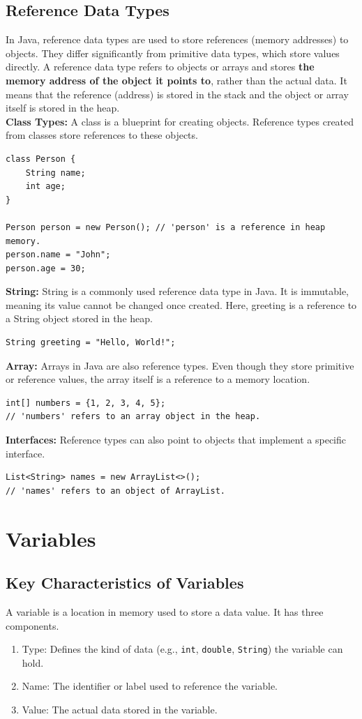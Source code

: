 \documentclass[letterpaper,12pt]{article}
\begin{document}
\subsection{Reference Data Types}
In Java, reference data types are used to store references (memory addresses) to objects. They differ significantly from primitive data types, which store values directly. A reference data type refers to objects or arrays and stores \textbf{the memory address of the object it points to}, rather than the actual data. It means that the reference (address) is stored in the stack and the object or array itself is stored in the heap.\\
\textbf{Class Types: }A class is a blueprint for creating objects. Reference types created from classes store references to these objects.
\begin{verbatim}
class Person {
    String name;
    int age;
}

Person person = new Person(); // 'person' is a reference in heap memory.
person.name = "John";
person.age = 30;
\end{verbatim}
\textbf{String:} String is a commonly used reference data type in Java. It is immutable, meaning its value cannot be changed once created. Here, greeting is a reference to a String object stored in the heap.
\begin{verbatim}
String greeting = "Hello, World!";
\end{verbatim}
\textbf{Array: }Arrays in Java are also reference types. Even though they store primitive or reference values, the array itself is a reference to a memory location.
\begin{verbatim}
int[] numbers = {1, 2, 3, 4, 5};
// 'numbers' refers to an array object in the heap.
\end{verbatim}
\textbf{Interfaces: }Reference types can also point to objects that implement a specific interface.
\begin{verbatim}
List<String> names = new ArrayList<>();
// 'names' refers to an object of ArrayList.
\end{verbatim}

\section{Variables}
\subsection{Key Characteristics of Variables}
A variable is a location in memory used to store a data value. It has three components.
\begin{enumerate}
    \item Type: Defines the kind of data (e.g., \texttt{int}, \texttt{double}, \texttt{String}) the variable can hold.
    \item Name: The identifier or label used to reference the variable.
    \item Value: The actual data stored in the variable.
\end{enumerate}
\end{document}
